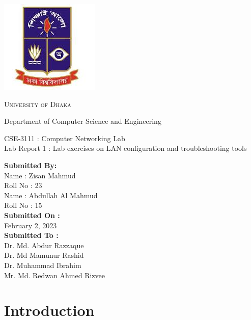 \documentclass[11pt]{article}
\begin{document}
\begin{titlepage}
    \begin{center}
        \includegraphics[scale=0.50]{du.jpeg}\par
        \begin{Huge}
            \textsc{University of Dhaka}\par
        \end{Huge}
        \begin{Large}
            Department of Computer Science and Engineering\par \vspace{1cm}
            CSE-3111 : Computer Networking Lab \\[12pt]
            Lab Report 1 : Lab exercises on LAN configuration and troubleshooting tools
        \end{Large}
    \end{center}
    \begin{large}
        \textbf{Submitted By:\\[12pt]}
        Name : Zisan Mahmud\\[8pt]
        Roll No : 23\\[12pt]
        Name :  Abdullah Al Mahmud\\[8pt]
        Roll No : 15\\[12pt]
        \textbf{Submitted On : \\[12pt]}
        February 2, 2023\\[20pt]
        \textbf{Submitted To :\\[12pt]}
        Dr. Md. Abdur Razzaque\\[12pt]
        Dr. Md Mamunur Rashid\\[12pt]
        Dr. Muhammad Ibrahim\\[12pt]
        Mr. Md. Redwan Ahmed Rizvee
    \end{large}
\end{titlepage}

\section{Introduction}
\end{document}

